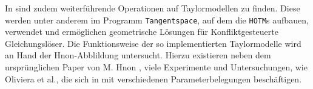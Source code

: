 In \cite{DBLP:conf/macis/BrausseKM15} sind zudem weiterführende Operationen auf Taylormodellen zu finden. Diese werden unter anderem im Programm \verb+Tangentspace+, auf dem die \verb+HOTM+s aufbauen, verwendet und ermöglichen geometrische Lösungen für Konfliktgesteuerte Gleichungslöser. Die Funktionsweise der so implementierten Taylormodelle wird an Hand der H\e non-Abblildung untersucht. Hierzu existieren neben dem ursprünglichen Paper von M. H\e non \cite{henon1976}, viele Experimente und Untersuchungen, wie Oliviera et al., die sich in \cite{MartinsdeOliveira2020} mit verschiedenen Parameterbelegungen beschäftigen.






